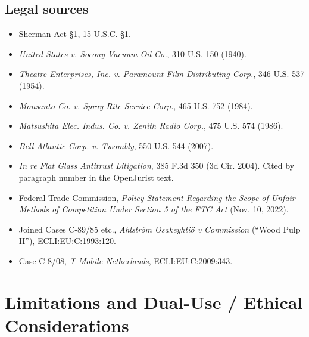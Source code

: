 \documentclass[11pt]{article}
\begin{document}
\subsection*{Legal sources}
\small
\begin{itemize}[leftmargin=*]
  \item Sherman Act \S1, 15 U.S.C. \S1.
  \item \emph{United States v. Socony-Vacuum Oil Co.}, 310 U.S. 150 (1940).
  \item \emph{Theatre Enterprises, Inc. v. Paramount Film Distributing Corp.}, 346 U.S. 537 (1954).
  \item \emph{Monsanto Co. v. Spray-Rite Service Corp.}, 465 U.S. 752 (1984).
  \item \emph{Matsushita Elec. Indus. Co. v. Zenith Radio Corp.}, 475 U.S. 574 (1986).
  \item \emph{Bell Atlantic Corp. v. Twombly}, 550 U.S. 544 (2007).
  \item \emph{In re Flat Glass Antitrust Litigation}, 385 F.3d 350 (3d Cir. 2004). Cited by paragraph number in the OpenJurist text.
  \item Federal Trade Commission, \emph{Policy Statement Regarding the Scope of Unfair Methods of Competition Under Section 5 of the FTC Act} (Nov. 10, 2022).
  \item Joined Cases C-89/85 etc., \emph{Ahlstr\"om Osakeyhti\"o v Commission} (``Wood Pulp II''), ECLI:EU:C:1993:120.
  \item Case C-8/08, \emph{T-Mobile Netherlands}, ECLI:EU:C:2009:343.
\end{itemize}
\normalsize

\appendix

\clearpage
\section{Limitations and Dual-Use / Ethical Considerations}
\label{app:limits}
\end{document}
